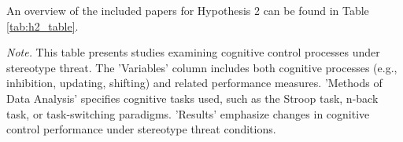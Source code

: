 \documentclass[
  stu, a4paper,floatsintext]{apa7}
\newenvironment{lltable}{\begin{landscape}\centering\begin{ThreePartTable}}{\end{ThreePartTable}\end{landscape}}
\begin{document}
An overview of the included papers for Hypothesis 2 can be found in Table \ref{tab:h2_table}.

\begin{lltable}

\begin{TableNotes}[para]
\normalsize{\textit{Note.} This table presents studies examining cognitive control processes under stereotype threat. The 'Variables' column includes both cognitive processes (e.g., inhibition, updating, shifting) and related performance measures. 'Methods of Data Analysis' specifies cognitive tasks used, such as the Stroop task, n-back task, or task-switching paradigms. 'Results' emphasize changes in cognitive control performance under stereotype threat conditions.}
\end{TableNotes}


\end{lltable}
\end{document}
